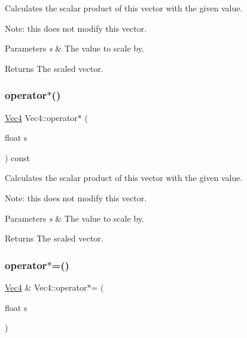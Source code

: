 Calculates the scalar product of this vector with the given value.

Note\+: this does not modify this vector.


\begin{DoxyParams}{Parameters}
{\em s} & The value to scale by. \\
\hline
\end{DoxyParams}
\begin{DoxyReturn}{Returns}
The scaled vector. 
\end{DoxyReturn}
\mbox{\label{classVec4_ad6bcce9a25272c63a5ad3b8cf658c732}} 
\subsubsection{\texorpdfstring{operator$\ast$()}{operator*()}\hspace{0.1cm}{\footnotesize\ttfamily [2/2]}}
{\footnotesize\ttfamily \hyperlink{classVec4}{Vec4} Vec4\+::operator$\ast$ (\begin{DoxyParamCaption}\item[{float}]{s }\end{DoxyParamCaption}) const\hspace{0.3cm}{\ttfamily [inline]}}

Calculates the scalar product of this vector with the given value.

Note\+: this does not modify this vector.


\begin{DoxyParams}{Parameters}
{\em s} & The value to scale by. \\
\hline
\end{DoxyParams}
\begin{DoxyReturn}{Returns}
The scaled vector. 
\end{DoxyReturn}
\mbox{\label{classVec4_a4631d90bca09546d285452d2e7a6f6dc}} 
\subsubsection{\texorpdfstring{operator$\ast$=()}{operator*=()}\hspace{0.1cm}{\footnotesize\ttfamily [1/2]}}
{\footnotesize\ttfamily \hyperlink{classVec4}{Vec4} \& Vec4\+::operator$\ast$= (\begin{DoxyParamCaption}\item[{float}]{s }\end{DoxyParamCaption})\hspace{0.3cm}{\ttfamily [inline]}}

